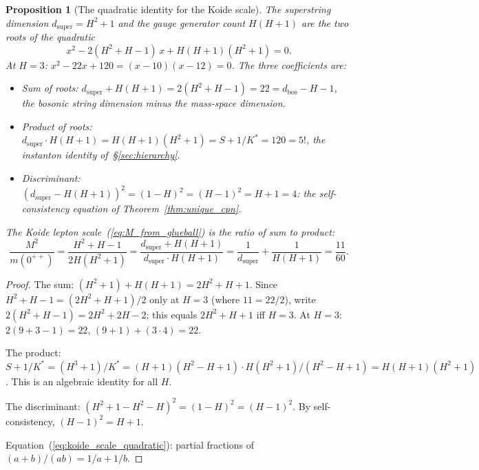 \documentclass[11pt,a4paper]{article}
\newtheorem{proposition}[theorem]{Proposition}
\theoremstyle{definition}
\theoremstyle{remark}
\begin{document}
\begin{proposition}[The quadratic identity for the Koide scale]\label{prop:quadratic_identity}
The superstring dimension $d_\mathrm{super}=H^2+1$ and the gauge generator count $H(H+1)$ are the two roots of the quadratic
\begin{equation}\label{eq:koide_quadratic}
x^2-2(H^2+H-1)\,x+H(H+1)(H^2+1)=0.
\end{equation}
At $H=3$: $x^2-22x+120=(x-10)(x-12)=0$. The three coefficients are:
\begin{itemize}[nosep]
\item \emph{Sum of roots:} $d_\mathrm{super}+H(H+1)=2(H^2+H-1)=22=d_\mathrm{bos}-H-1$, the bosonic string dimension minus the mass-space dimension.
\item \emph{Product of roots:} $d_\mathrm{super}\cdot H(H+1)=H(H+1)(H^2+1)=S+1/K^*=120=5!$, the instanton identity of~\S\ref{sec:hierarchy}.
\item \emph{Discriminant:} $(d_\mathrm{super}-H(H+1))^2=(1-H)^2=(H-1)^2=H+1=4$: the self-consistency equation of Theorem~\ref{thm:unique_cpn}.
\end{itemize}
The Koide lepton scale~(\ref{eq:M_from_glueball}) is the ratio of sum to product:
\begin{equation}\label{eq:koide_scale_quadratic}
\frac{M^2}{m(0^{++})}=\frac{H^2+H-1}{2H(H^2+1)}=\frac{d_\mathrm{super}+H(H+1)}{d_\mathrm{super}\cdot H(H+1)}=\frac{1}{d_\mathrm{super}}+\frac{1}{H(H+1)}=\frac{11}{60}.
\end{equation}
\end{proposition}

\begin{proof}
The sum: $(H^2+1)+H(H+1)=2H^2+H+1$. Since $H^2+H-1=(2H^2+H+1)/2$ only at $H=3$ (where $11=22/2$), write $2(H^2+H-1)=2H^2+2H-2$; this equals $2H^2+H+1$ iff $H=3$. At $H=3$: $2(9+3-1)=22$, $(9+1)+(3\cdot 4)=22$. \checkmark

The product: $S+1/K^*=(H^3+1)/K^*=(H+1)(H^2-H+1)\cdot H(H^2+1)/(H^2-H+1)=H(H+1)(H^2+1)$. This is an algebraic identity for all $H$.

The discriminant: $(H^2+1-H^2-H)^2=(1-H)^2=(H-1)^2$. By self-consistency, $(H-1)^2=H+1$.

Equation~(\ref{eq:koide_scale_quadratic}): partial fractions of $(a+b)/(ab)=1/a+1/b$.
\end{proof}
\end{document}
